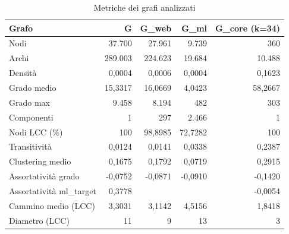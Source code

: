 \begin{table}[H]
\centering
\caption{Metriche dei grafi analizzati}
\label{tab:metriche_grafi}
\begin{tabular}{lrrrr}
\toprule
Grafo & G & G\_web & G\_ml & G\_core (k=34) \\
\midrule
Nodi & 37.700 & 27.961 & 9.739 & 360 \\
Archi & 289.003 & 224.623 & 19.684 & 10.488 \\
Densità & 0,0004 & 0,0006 & 0,0004 & 0,1623 \\
Grado medio & 15,3317 & 16,0669 & 4,0423 & 58,2667 \\
Grado max & 9.458 & 8.194 & 482 & 303 \\
Componenti & 1 & 297 & 2.466 & 1 \\
Nodi LCC (\%) & 100 & 98,8985 & 72,7282 & 100 \\
Transitività & 0,0124 & 0,0141 & 0,0338 & 0,2387 \\
Clustering medio & 0,1675 & 0,1792 & 0,0719 & 0,2915 \\
Assortatività grado & -0,0752 & -0,0871 & -0,0910 & -0,1420 \\
Assortatività ml\_target & 0,3778 &  &  & -0,0054 \\
Cammino medio (LCC) & 3,3031 & 3,1142 & 4,5156 & 1,8418 \\
Diametro (LCC) & 11 & 9 & 13 & 3 \\
\bottomrule
\end{tabular}
\end{table}
